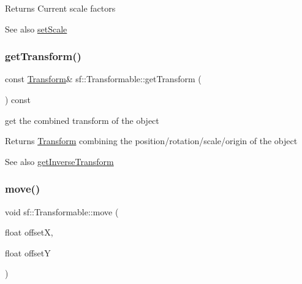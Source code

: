 \begin{DoxyReturn}{Returns}
Current scale factors
\end{DoxyReturn}
\begin{DoxySeeAlso}{See also}
\hyperlink{classsf_1_1_transformable_aaec50b46b3f41b054763304d1e727471}{set\+Scale} 
\end{DoxySeeAlso}
\mbox{\label{classsf_1_1_transformable_a7f7c3f0bab3f162b13613904fbdbb9ad}} 
\subsubsection{\texorpdfstring{get\+Transform()}{getTransform()}}
{\footnotesize\ttfamily const \hyperlink{classsf_1_1_transform}{Transform}\& sf\+::\+Transformable\+::get\+Transform (\begin{DoxyParamCaption}{ }\end{DoxyParamCaption}) const}



get the combined transform of the object 

\begin{DoxyReturn}{Returns}
\hyperlink{classsf_1_1_transform}{Transform} combining the position/rotation/scale/origin of the object
\end{DoxyReturn}
\begin{DoxySeeAlso}{See also}
\hyperlink{classsf_1_1_transformable_ab18b25f51263252ff3811465eb7e9fb1}{get\+Inverse\+Transform} 
\end{DoxySeeAlso}
\mbox{\label{classsf_1_1_transformable_a86b461d6a941ad390c2ad8b6a4a20391}} 
\subsubsection{\texorpdfstring{move()}{move()}\hspace{0.1cm}{\footnotesize\ttfamily [1/2]}}
{\footnotesize\ttfamily void sf\+::\+Transformable\+::move (\begin{DoxyParamCaption}\item[{float}]{offsetX,  }\item[{float}]{offsetY }\end{DoxyParamCaption})}



